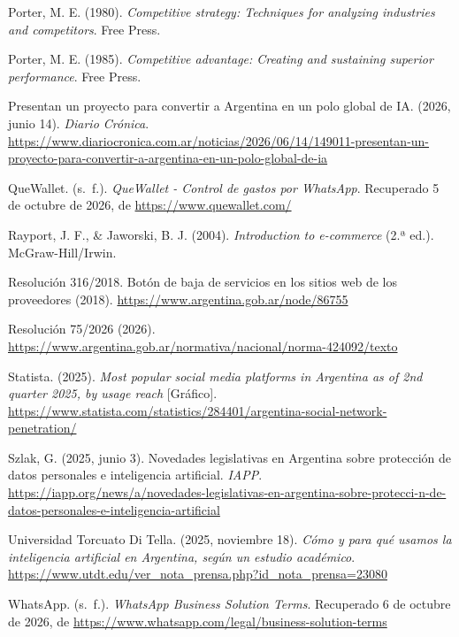 \begin{CSLReferences}{1}{0}
Porter, M. E. (1980). \emph{Competitive strategy: Techniques for
analyzing industries and competitors}. Free Press.

Porter, M. E. (1985). \emph{Competitive advantage: Creating and
sustaining superior performance}. Free Press.

Presentan un proyecto para convertir a Argentina en un polo global de
IA. (2026, junio 14). \emph{Diario Crónica}.
\url{https://www.diariocronica.com.ar/noticias/2026/06/14/149011-presentan-un-proyecto-para-convertir-a-argentina-en-un-polo-global-de-ia}

QueWallet. (s.~f.). \emph{QueWallet - Control de gastos por WhatsApp}.
Recuperado 5 de octubre de 2026, de \url{https://www.quewallet.com/}

Rayport, J. F., \& Jaworski, B. J. (2004). \emph{Introduction to
e-commerce} (2.ª ed.). McGraw-Hill/Irwin.

Resolución 316/2018. Botón de baja de servicios en los sitios web de los
proveedores (2018). \url{https://www.argentina.gob.ar/node/86755}

Resolución 75/2026 (2026).
\url{https://www.argentina.gob.ar/normativa/nacional/norma-424092/texto}

Statista. (2025). \emph{Most popular social media platforms in Argentina
as of 2nd quarter 2025, by usage reach} {[}Gráfico{]}.
\url{https://www.statista.com/statistics/284401/argentina-social-network-penetration/}

Szlak, G. (2025, junio 3). Novedades legislativas en Argentina sobre
protección de datos personales e inteligencia artificial. \emph{IAPP}.
\url{https://iapp.org/news/a/novedades-legislativas-en-argentina-sobre-protecci-n-de-datos-personales-e-inteligencia-artificial}

Universidad Torcuato Di Tella. (2025, noviembre 18). \emph{Cómo y para
qué usamos la inteligencia artificial en Argentina, según un estudio
académico}.
\url{https://www.utdt.edu/ver_nota_prensa.php?id_nota_prensa=23080}

WhatsApp. (s.~f.). \emph{WhatsApp Business Solution Terms}. Recuperado 6
de octubre de 2026, de
\url{https://www.whatsapp.com/legal/business-solution-terms}


\end{CSLReferences}
